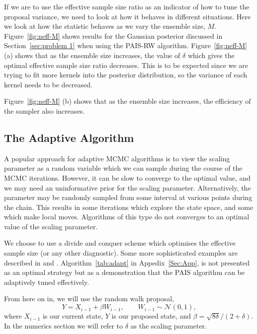 \documentclass[final]{siamltex}
\begin{document}
If we are to use the effective sample size ratio as an indicator of
how to tune the proposal variance, we need to look at how it behaves
in different situations. Here we look at how the statistic behaves as we vary the ensemble size, $M$. Figure~\ref{fig:neff-M} shows results for the Gaussian posterior discussed in Section~\ref{sec:problem 1} when using the PAIS-RW algorithm. Figure~\ref{fig:neff-M} (a) shows that as the ensemble size increases, the value of $\delta$ which gives the optimal effective sample size ratio decreases. This is to be expected since we are trying to fit more kernels into the posterior distribution, so the variance of each kernel needs to be decreased.

Figure~\ref{fig:neff-M} (b) shows that as the ensemble size increases, the efficiency of the sampler also increases.

\subsection{The Adaptive Algorithm}\label{sec:adapt}

A popular approach for adaptive MCMC algorithms is to view the scaling
parameter as a random variable which we can sample during the course
of the MCMC iterations. However, it can be slow to converge to the
optimal value, and we may need an
uninformative prior for the scaling parameter. Alternatively, the parameter may be randomly sampled from some interval at various points during the chain. This results in some iterations which explore the state space, and some which make local moves. Algorithms of this type do not converges to an optimal value of the scaling parameter.

We choose to use a divide and conquer scheme which optimises the effective sample size (or any other diagnostic). Some more sophisticated examples are described in \cite{roberts2009examples} and \cite{Ji2013adaptive}. Algorithm~\ref{tab:adapt} in Appedix~\ref{Sec:App}, is not presented as an optimal strategy but as a demonstration that the PAIS algorithm can be adaptively tuned effectively.

From here on in, we will use the random walk proposal,
\begin{equation}Y = X_{i-1}+\beta W_{i-1}, \qquad W_{i-1} \sim \mathcal{N}(0,1),
\end{equation}
where $X_{i-1}$ is our current state, $Y$ is our proposed state, and $\beta = \sqrt{8\delta}/(2+\delta)$. In the numerics section we will refer to $\delta$ as the scaling parameter.
\end{document}
